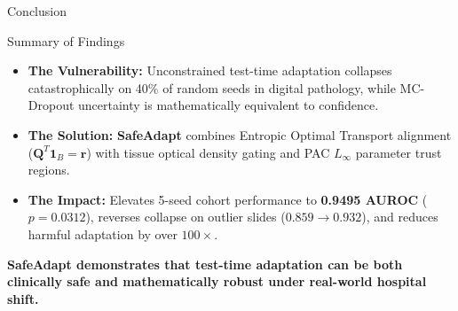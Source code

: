\documentclass[aspectratio=169,10pt]{beamer}
\begin{document}
\begin{frame}{Conclusion}
    \begin{block}{Summary of Findings}
        \small
        \begin{itemize}
            \item \textbf{The Vulnerability:} Unconstrained test-time adaptation collapses catastrophically on 40\% of random seeds in digital pathology, while MC-Dropout uncertainty is mathematically equivalent to confidence.
            \item \textbf{The Solution:} \textbf{SafeAdapt} combines Entropic Optimal Transport alignment ($\mathbf{Q}^T \mathbf{1}_B = \mathbf{r}$) with tissue optical density gating and PAC $L_\infty$ parameter trust regions.
            \item \textbf{The Impact:} Elevates 5-seed cohort performance to \textbf{0.9495 AUROC} ($p = 0.0312$), reverses collapse on outlier slides ($0.859 \to 0.932$), and reduces harmful adaptation by over \textbf{$100\times$}.
        \end{itemize}
    \end{block}
    \vspace{0.3cm}
    \centering
    \large
    \textbf{SafeAdapt demonstrates that test-time adaptation can be both clinically safe and mathematically robust under real-world hospital shift.}
\end{frame}
\end{document}
